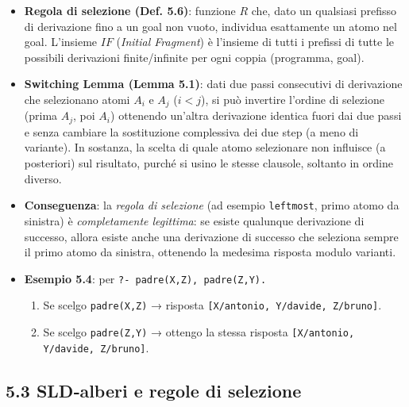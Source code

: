 \documentclass[12pt]{article}
\begin{document}
\begin{itemize}
  \item \textbf{Regola di selezione (Def. 5.6)}: funzione $R$ che, dato un qualsiasi prefisso di derivazione fino a un goal non vuoto, individua esattamente un atomo nel goal. L’insieme $IF$ (\emph{Initial Fragment}) è l’insieme di tutti i prefissi di tutte le possibili derivazioni finite/infinite per ogni coppia (programma, goal).

  \item \textbf{Switching Lemma (Lemma 5.1)}: dati due passi consecutivi di derivazione che selezionano atomi $A_i$ e $A_j$ ($i<j$), si può invertire l’ordine di selezione (prima $A_j$, poi $A_i$) ottenendo un’altra derivazione identica fuori dai due passi e senza cambiare la sostituzione complessiva dei due step (a meno di variante). In sostanza, la scelta di quale atomo selezionare non influisce (a posteriori) sul risultato, purché si usino le stesse clausole, soltanto in ordine diverso.

  \item \textbf{Conseguenza}: la \emph{regola di selezione} (ad esempio \texttt{leftmost}, primo atomo da sinistra) è \emph{completamente legittima}: se esiste qualunque derivazione di successo, allora esiste anche una derivazione di successo che seleziona sempre il primo atomo da sinistra, ottenendo la medesima risposta modulo varianti.

  \item \textbf{Esempio 5.4}: per \texttt{?- padre(X,Z), padre(Z,Y).}
  \begin{enumerate}
    \item Se scelgo \texttt{padre(X,Z)} → risposta \texttt{[X/antonio, Y/davide, Z/bruno]}.
    \item Se scelgo \texttt{padre(Z,Y)} → ottengo la stessa risposta \texttt{[X/antonio, Y/davide, Z/bruno]}.
  \end{enumerate}
\end{itemize}

\subsection*{5.3 SLD‐alberi e regole di selezione}
\end{document}
